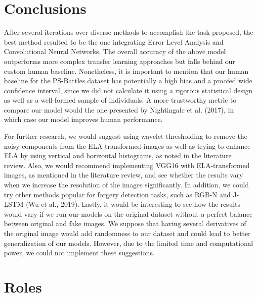 \documentclass[11pt]{article}
\begin{document}
\section{Conclusions}

After several iterations over diverse methods to accomplish the task proposed, the best method resulted to be the one integrating Error Level Analysis and Convolutional Neural Networks. The overall accuracy of the above model outperforms more complex transfer learning approaches but falls behind our custom human baseline. Nonetheless, it is important to mention that our human baseline for the PS-Battles dataset has potentially a high bias and a proofed wide confidence interval, since we did not calculate it using a rigorous statistical design as well as a well-formed sample of individuals. A more trustworthy metric to compare our model would the one presented by Nightingale et al. (2017), in which case our model improves human performance.

For further research, we would suggest using wavelet thresholding to remove the noisy components from the ELA-transformed images as well as trying to enhance ELA by using vertical and horizontal histograms, as noted in the literature review. Also, we would recommend implementing VGG16 with ELA-transformed images, as mentioned in the literature review, and see whether the results vary when we increase the resolution of the images significantly.  In addition, we could try other methods popular for forgery detection tasks, such as RGB-N and J-LSTM (Wu et al., 2019). Lastly, it would be interesting to see how the results would vary if we run our models on the original dataset without a perfect balance between original and fake images. We suppose that having several derivatives of the original image would add randomness to our dataset and could lead to better generalization of our models. However, due to the limited time and computational power, we could not implement these suggestions.


\medskip

\nocite{*}



\newpage

\section{Roles}
\end{document}
